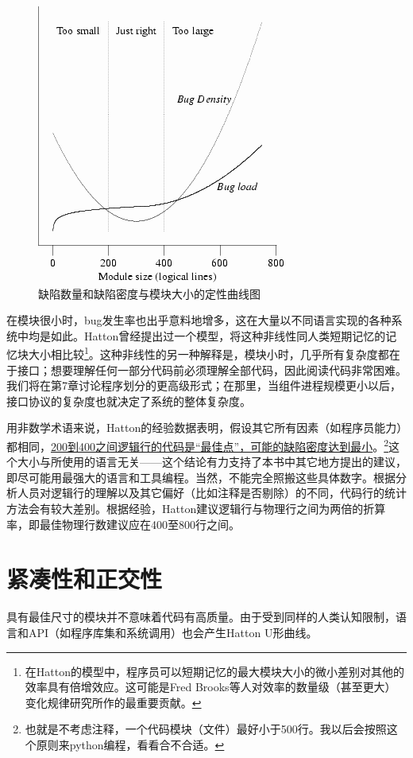 \documentclass[12pt,oneside]{book}
\begin{document}
\begin{figure}[H]
\centering
\includegraphics[scale=1 , keepaspectratio]{qu-xian-shu-liang-mo-kuai-da-xiao.png}
\caption{缺陷数量和缺陷密度与模块大小的定性曲线图}
\end{figure}


在模块很小时，bug发生率也出乎意料地增多，这在大量以不同语言实现的各种系统中均是如此。Hatton曾经提出过一个模型，将这种非线性同人类短期记忆的记忆块大小相比较\footnote{在Hatton的模型中，程序员可以短期记忆的最大模块大小的微小差别对其他的效率具有倍增效应。这可能是Fred Brooks等人对效率的数量级（甚至更大）变化规律研究所作的最重要贡献。}。这种非线性的另一种解释是，模块小时，几乎所有复杂度都在于接口；想要理解任何一部分代码前必须理解全部代码，因此阅读代码非常困难。我们将在第7章讨论程序划分的更高级形式；在那里，当组件进程规模更小以后，接口协议的复杂度也就决定了系统的整体复杂度。

用非数学术语来说，Hatton的经验数据表明，假设其它所有因素（如程序员能力）都相同，\uline{200到400之间逻辑行的代码是“最佳点”，可能的缺陷密度达到最小}。\footnote{也就是不考虑注释，一个代码模块（文件）最好小于500行。我以后会按照这个原则来python编程，看看合不合适。}这个大小与所使用的语言无关——这个结论有力支持了本书中其它地方提出的建议，即尽可能用最强大的语言和工具编程。当然，不能完全照搬这些具体数字。根据分析人员对逻辑行的理解以及其它偏好（比如注释是否剔除）的不同，代码行的统计方法会有较大差别。根据经验，Hatton建议逻辑行与物理行之间为两倍的折算率，即最佳物理行数建议应在400至800行之间。


\section{紧凑性和正交性}
具有最佳尺寸的模块并不意味着代码有高质量。由于受到同样的人类认知限制，语言和API（如程序库集和系统调用）也会产生Hatton U形曲线。
\end{document}
